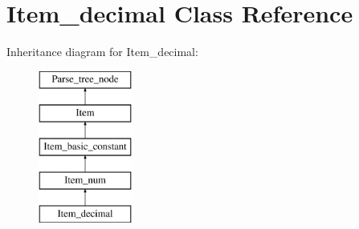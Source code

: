 \hypertarget{classItem__decimal}{}\section{Item\+\_\+decimal Class Reference}
\label{classItem__decimal}
Inheritance diagram for Item\+\_\+decimal\+:\begin{figure}[H]
\begin{center}
\leavevmode
\includegraphics[height=5.000000cm]{classItem__decimal}
\end{center}
\end{figure}
